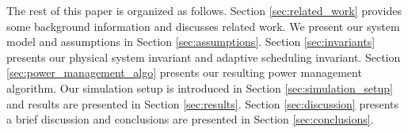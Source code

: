 The rest of this paper is organized as follows. Section \ref{sec:related_work}
provides some background information and discusses related work. We present our
system model and assumptions in Section \ref{sec:assumptions}. Section
\ref{sec:invariants} presents our physical system 
invariant and adaptive scheduling invariant. Section \ref{sec:power_management_algo} 
presents our resulting power management algorithm. Our simulation setup is introduced 
in Section \ref{sec:simulation_setup} and results are presented in Section
\ref{sec:results}. Section \ref{sec:discussion} presents a brief discussion and
conclusions are presented in Section \ref{sec:conclusions}.

